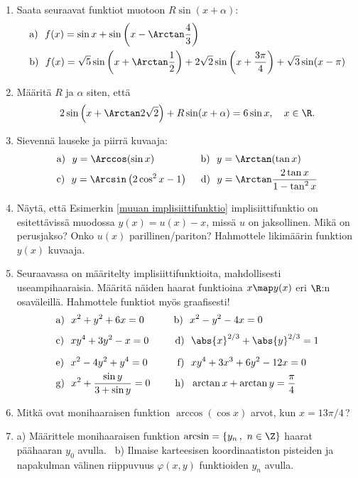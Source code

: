 \begin{enumerate}
\item
Saata seuraavat funktiot muotoon $R\sin(x+\alpha)$:
\begin{align*}
&\text{a)}\ \ f(x)=\sin x+\sin\left(x-\Arctan\frac{4}{3}\right) \\
&\text{b)}\ \ f(x)=\sqrt{5}\sin\left(x+\Arctan\frac{1}{2}\right)
                +2\sqrt{2}\sin\left(x+\frac{3\pi}{4}\right)+\sqrt{3}\sin(x-\pi)
\end{align*}

\item
Määritä $R$ ja $\alpha$ siten, että
\[
2\sin\left(x+\Arctan 2\sqrt{2}\right)+R\sin(x+\alpha)=6\sin x, \quad x\in\R.
\]

\item
Sievennä lauseke ja piirrä kuvaaja:
\begin{align*}
&\text{a)}\ \ y=\Arccos(\sin x) \qquad\qquad\ \
 \text{b)}\ \ y=\Arctan(\tan x) \\
&\text{c)}\ \ y=\Arcsin\left(2\cos^2 x-1\right) \quad\ 
 \text{d)}\ \ y=\Arctan\frac{2\tan x}{1-\tan^2 x}
\end{align*}

\item
Näytä, että Esimerkin \ref{muuan implisiittifunktio} implisiittifunktio on esitettävissä
muodossa $y(x)=u(x)-x$, missä $u$ on jaksollinen. Mikä on perusjakso? Onko $u(x)$
parillinen/pariton? Hahmottele likimäärin funktion $y(x)$ kuvaaja. 

\item
Seuraavassa on määritelty implisiittifunktioita, mahdollisesti useampihaaraisia. Määritä näiden
haarat funktioina $x \map y(x)$ eri $\R$:n osaväleillä. Hahmottele funktiot myös graafisesti!
\begin{align*}
&\text{a)}\ \ x^2+y^2+6x=0 \qquad\ \ \
 \text{b)}\ \ x^2-y^2-4x=0 \\[1mm]
&\text{c)}\ \ xy^4+3y^2-x=0 \qquad\ \
 \text{d)}\ \ \abs{x}^{2/3}+\abs{y}^{2/3}=1 \\[2mm]
&\text{e)}\ \ x^2-4y^2+y^4=0 \qquad\quad
 \text{f)}\ \ xy^4+3x^3+6y^2-12x=0 \\
&\text{g)}\ \ x^2+\frac{\sin y}{3+\sin y}=0 \qquad\,\
 \text{h)}\ \ \arctan x + \arctan y=\frac{\pi}{4}
\end{align*}

\item
Mitkä ovat monihaaraisen funktion $\arccos(\cos x)$ arvot, kun $x=13\pi/4$\,?

\item
a) Määrittele monihaaraisen funktion $\arcsin=\{y_n\,,\ n\in\Z\}$ haarat päähaaran $y_0$
avulla. \ b) Ilmaise karteesisen koordinaatiston pisteiden ja napakulman välinen riippuvuus
$\varphi(x,y)$ funktioiden $y_n$ avulla.


\end{enumerate}
